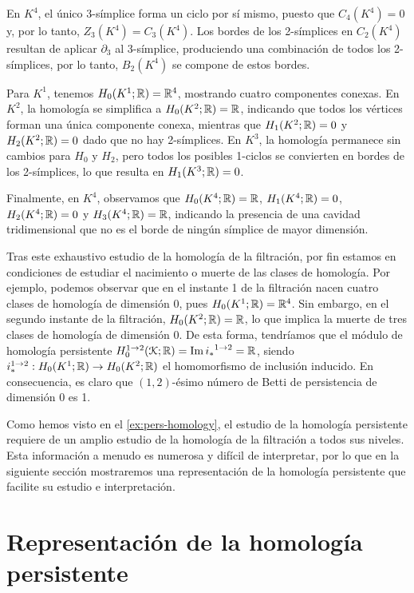 \begin{ejemplo}
	En $K^4$, el único 3-símplice forma un ciclo por sí mismo, puesto que $C_4(K^4) = 0$ y, por lo tanto, $Z_3(K^4) = C_3(K^4)$. Los bordes de los 2-símplices en $C_2(K^4)$ resultan de aplicar $\partial_3$ al 3-símplice, produciendo una combinación de todos los 2-símplices, por lo tanto, $B_2(K^4)$ se compone de estos bordes.
	
	Para \(K^1\), tenemos \(H_0(K^1; \mathbb{R}) = \mathbb{R}^4\), mostrando cuatro componentes conexas. En \(K^2\), la homología se simplifica a \(H_0(K^2; \mathbb{R}) = \mathbb{R}\), indicando que todos los vértices forman una única componente conexa, mientras que \(H_1(K^2; \mathbb{R}) = 0\) y \(H_2(K^2; \mathbb{R}) = 0\) dado que no hay 2-símplices. En \(K^3\), la homología permanece sin cambios para \(H_0\) y \(H_2\), pero todos los posibles 1-ciclos se convierten en bordes de los 2-símplices, lo que resulta en \(H_1(K^3; \mathbb{R}) = 0\).
	
	Finalmente, en \(K^4\), observamos que \(H_0(K^4; \mathbb{R}) = \mathbb{R}\), \(H_1(K^4; \mathbb{R}) = 0\), \(H_2(K^4; \mathbb{R}) = 0\) y \(H_3(K^4; \mathbb{R}) = \mathbb{R}\), indicando la presencia de una cavidad tridimensional que no es el borde de ningún símplice de mayor dimensión.
	
	Tras este exhaustivo estudio de la homología de la filtración, por fin estamos en condiciones de estudiar el nacimiento o muerte de las clases de homología. Por ejemplo, podemos observar que en el instante 1 de la filtración nacen cuatro clases de homología de dimensión 0, pues $H_0(K^1;\mathbb{R}) = \mathbb{R}^4$. Sin embargo, en el segundo instante de la filtración, $H_0(K^2; \mathbb{R}) = \mathbb{R}$, lo que implica la muerte de tres clases de homología de dimensión 0. De esta forma, tendríamos que el módulo de homología persistente $H_0^{1 \to 2}(\mathcal{K}; \mathbb{R}) = \operatorname{Im} {i_*}^{1 \to 2} = \mathbb{R}$, siendo $i^{1 \to 2}_* : H_0(K^1;\mathbb{R}) \to H_0(K^2;\mathbb{R})$ el homomorfismo de inclusión inducido. En consecuencia, es claro que $(1,2)$-ésimo número de Betti de persistencia de dimensión 0 es 1.
\end{ejemplo}

Como hemos visto en el \autoref{ex:pers-homology}, el estudio de la homología persistente requiere de un amplio estudio de la homología de la filtración a todos sus niveles. Esta información a menudo es numerosa y difícil de interpretar, por lo que en la siguiente sección mostraremos una representación de la homología persistente que facilite su estudio e interpretación.

\section{Representación de la homología persistente}

